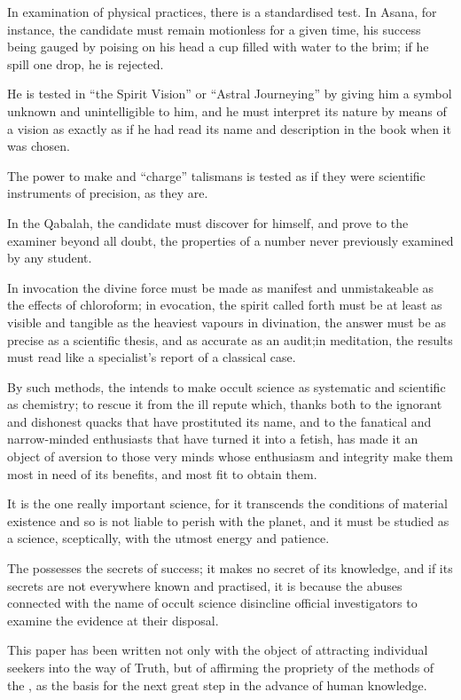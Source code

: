 In examination of physical practices, there is a standardised test.  In Asana, for instance, the candidate must remain motionless for a given time, his success being gauged by poising on his head a cup filled with water to the brim; if he spill one drop, he is rejected.

He is tested in \enquote{the Spirit Vision} or \enquote{Astral Journeying} by giving him a symbol unknown and unintelligible to him, and he must interpret its nature by means of a vision as exactly as if he had read its name and description in the book when it was chosen.

The power to make and \enquote{charge} talismans is tested as if they were scientific instruments of precision, as they are.

In the Qabalah, the candidate must discover for himself, and prove to the examiner beyond all doubt, the properties of a number never previously examined by any student.

In invocation the divine force must be made as manifest and unmistakeable as the effects of chloroform; in evocation, the spirit called forth must be at least as visible and tangible as the heaviest vapours in divination, the answer must be as precise as a scientific thesis, and as accurate as an audit;in meditation, the results must read like a specialist's report of a classical case.

By such methods, the \Argentium{} intends to make occult science as systematic and scientific as chemistry; to rescue it from the ill repute which, thanks both to the ignorant and dishonest quacks that have prostituted its name, and to the fanatical and narrow-minded enthusiasts that have turned it into a fetish, has made it an object of aversion to those very minds whose enthusiasm and integrity make them most in need of its benefits, and most fit to obtain them.

It is the one really important science, for it transcends the conditions of material existence and so is not liable to perish with the planet, and it must be studied as a science, sceptically, with the utmost energy and patience.

The \Argentium{} possesses the secrets of success; it makes no secret of its knowledge, and if its secrets are not everywhere known and practised, it is because the abuses connected with the name of occult science disincline official investigators to examine the evidence at their disposal.

This paper has been written not only with the object of attracting individual seekers into the way of Truth, but of affirming the propriety of the methods of the \Argentium{}, as the basis for the next great step in the advance of human knowledge.

